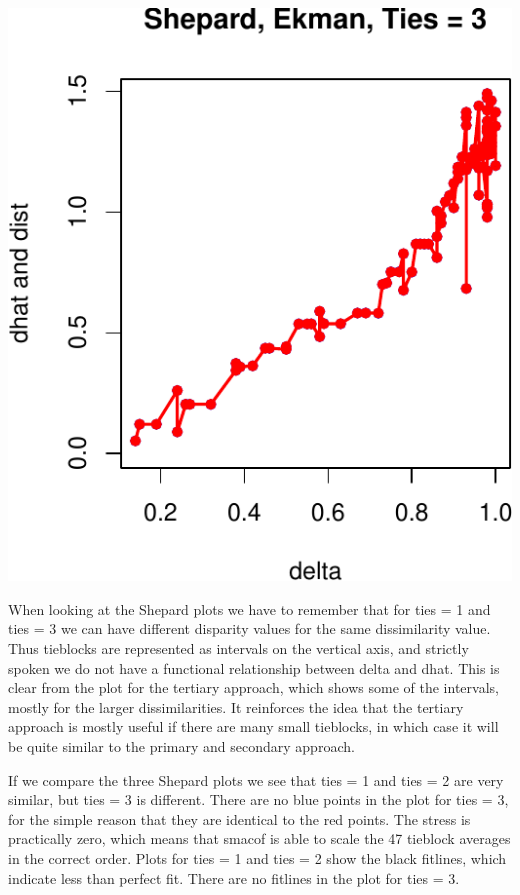 \documentclass[
  12pt,
]{article}
\begin{document}
\begin{center}\includegraphics{smacofRO_files/figure-latex/plotekman-3} \end{center}

When looking at the
Shepard plots we have to remember that for ties = 1 and ties = 3 we can have different disparity values for the
same dissimilarity value. Thus tieblocks are represented as intervals on the vertical axis, and strictly spoken we do not have a functional relationship between delta and dhat. This is clear from the plot for the
tertiary approach, which shows some of the intervals, mostly for the larger dissimilarities. It reinforces the
idea that the tertiary approach is mostly useful if there are many small tieblocks, in which case it will be quite similar to the primary and secondary approach.

If we compare the three Shepard plots we see that ties = 1 and ties = 2 are very similar, but ties = 3
is different. There are no blue points in the plot for ties = 3, for the simple reason that they are
identical to the red points. The stress is practically zero, which means that smacof is able to scale
the 47 tieblock averages in the correct order. Plots for ties = 1 and ties = 2
show the black fitlines, which indicate less than perfect fit. There are no fitlines in the plot for ties = 3.
\end{document}
